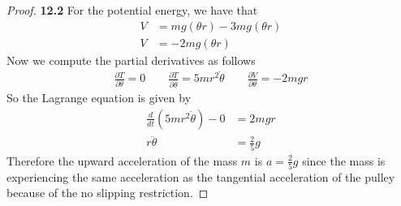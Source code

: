 \documentclass[11pt]{article}
\theoremstyle{definition}
\begin{document}
\begin{proof}{\textbf{12.2}}
    For the potential energy, we have that
    \begin{align*}
        V &= mg(\theta r) - 3mg(\theta r)\\
        V &= -2mg(\theta r)
    \end{align*}
    Now we compute the partial derivatives as follows
    \begin{align*}
        \frac{\partial T}{\partial \theta} = 0\quad\quad
        \frac{\partial T}{\partial \dot\theta} = 5mr^2\dot\theta\quad\quad
        \frac{\partial V}{\partial \theta} = -2mgr
    \end{align*}
    So the Lagrange equation is given by
    \begin{align*}
        \frac{d}{dt}(5mr^2\dot\theta) - 0 &= 2mgr\\
        r\ddot\theta &= \frac{2}{5}g
    \end{align*}
    Therefore the upward acceleration of the mass $m$ is $a = \frac{2}{5}g$
    since the mass is experiencing the same acceleration as the tangential
    acceleration of the pulley because of the no slipping restriction.
\end{proof}
\cleardoublepage
\end{document}
